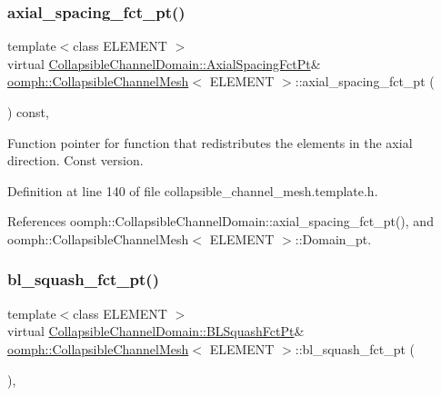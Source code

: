 \subsubsection{\texorpdfstring{axial\+\_\+spacing\+\_\+fct\+\_\+pt()}{axial\_spacing\_fct\_pt()}\hspace{0.1cm}{\footnotesize\ttfamily [2/2]}}
{\footnotesize\ttfamily template$<$class E\+L\+E\+M\+E\+NT $>$ \\
virtual \hyperlink{classoomph_1_1CollapsibleChannelDomain_a317472dab112beac771ecf6442a465f5}{Collapsible\+Channel\+Domain\+::\+Axial\+Spacing\+Fct\+Pt}\& \hyperlink{classoomph_1_1CollapsibleChannelMesh}{oomph\+::\+Collapsible\+Channel\+Mesh}$<$ E\+L\+E\+M\+E\+NT $>$\+::axial\+\_\+spacing\+\_\+fct\+\_\+pt (\begin{DoxyParamCaption}{ }\end{DoxyParamCaption}) const\hspace{0.3cm}{\ttfamily [inline]}, {\ttfamily [virtual]}}



Function pointer for function that redistributes the elements in the axial direction. Const version. 



Definition at line 140 of file collapsible\+\_\+channel\+\_\+mesh.\+template.\+h.



References oomph\+::\+Collapsible\+Channel\+Domain\+::axial\+\_\+spacing\+\_\+fct\+\_\+pt(), and oomph\+::\+Collapsible\+Channel\+Mesh$<$ E\+L\+E\+M\+E\+N\+T $>$\+::\+Domain\+\_\+pt.

\mbox{\label{classoomph_1_1CollapsibleChannelMesh_aac6057b4e572cb47923570b5e9c781c4}} 
\subsubsection{\texorpdfstring{bl\+\_\+squash\+\_\+fct\+\_\+pt()}{bl\_squash\_fct\_pt()}\hspace{0.1cm}{\footnotesize\ttfamily [1/2]}}
{\footnotesize\ttfamily template$<$class E\+L\+E\+M\+E\+NT $>$ \\
virtual \hyperlink{classoomph_1_1CollapsibleChannelDomain_a2bf1d7943bfac134a5c27a54c7e1faed}{Collapsible\+Channel\+Domain\+::\+B\+L\+Squash\+Fct\+Pt}\& \hyperlink{classoomph_1_1CollapsibleChannelMesh}{oomph\+::\+Collapsible\+Channel\+Mesh}$<$ E\+L\+E\+M\+E\+NT $>$\+::bl\+\_\+squash\+\_\+fct\+\_\+pt (\begin{DoxyParamCaption}{ }\end{DoxyParamCaption})\hspace{0.3cm}{\ttfamily [inline]}, {\ttfamily [virtual]}}



